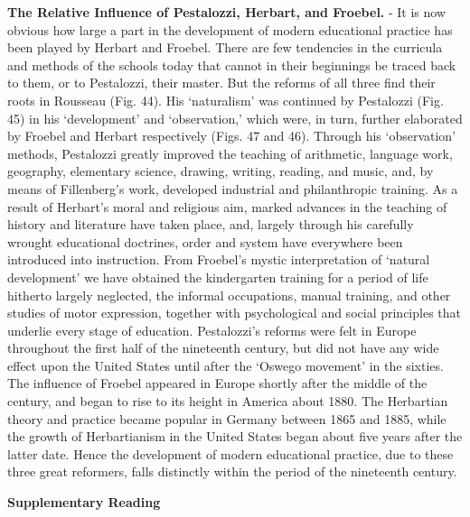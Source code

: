 \documentclass[]{book}
\begin{document}
\textbf{The Relative Influence of Pestalozzi, Herbart, and Froebel.} - It is now obvious how large a part in the development of modern educational practice has been played by Herbart and Froebel. There are few tendencies in the curricula and methods of the schools today that cannot in their beginnings be traced back to them, or to Pestalozzi, their master. But the reforms of all three find their roots in Rousseau (Fig. 44). His `naturalism' was continued by Pestalozzi (Fig. 45) in his `development' and `observation,' which were, in turn, further elaborated by Froebel and Herbart respectively (Figs. 47 and 46). Through his `observation' methods, Pestalozzi greatly improved the teaching of arithmetic, language work, geography, elementary science, drawing, writing, reading, and music, and, by means of Fillenberg's work, developed industrial and philanthropic training. As a result of Herbart's moral and religious aim, marked advances in the teaching of history and literature have taken place, and, largely through his carefully wrought educational doctrines, order and system have everywhere been introduced into instruction. From Froebel's mystic interpretation of `natural development' we have obtained the kindergarten training for a period of life hitherto largely neglected, the informal occupations, manual training, and other studies of motor expression, together with psychological and social principles that underlie every stage of education. Pestalozzi's reforms were felt in Europe throughout the first half of the nineteenth century, but did not have any wide effect upon the United States until after the `Oswego movement' in the sixties. The influence of Froebel appeared in Europe shortly after the middle of the century, and began to rise to its height in America about 1880. The Herbartian theory and practice became popular in Germany between 1865 and 1885, while the growth of Herbartianism in the United States began about five years after the latter date. Hence the development of modern educational practice, due to these three great reformers, falls distinctly within the period of the nineteenth century.

\textbf{Supplementary Reading}
\end{document}
